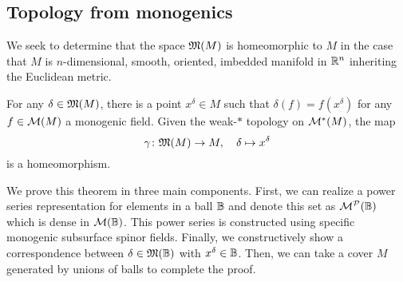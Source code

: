 \subsection{Topology from monogenics}

We seek to determine that the space $\mathfrak{M}(M)$ is homeomorphic to $M$ in the case that $M$ is $n$-dimensional, smooth, oriented, imbedded manifold in $\mathbb{R}^n$ inheriting the Euclidean metric. 

\begin{theorem}
\label{thm:gelfand}
For any $\delta \in \mathfrak{M}(M)$, there is a point $x^\delta \in M$ such that $\delta(f) = f(x^\delta)$ for any $f\in \mathcal{M}(M)$ a monogenic field. Given the weak-$\ast$ topology on $\mathcal{M}^*(M)$, the map
\[
\gamma \colon \mathfrak{M}(M) \to M, \quad \delta \mapsto x^\delta
\]
is a homeomorphism. 
\end{theorem}

We prove this theorem in three main components. First, we can realize a power series representation for elements in a ball $\mathbb{B}$ and denote this set as $\mathcal{M}^\mathcal{P}(\mathbb{B})$ which is dense in $\mathcal{M}(\mathbb{B})$. This power series is constructed using specific monogenic subsurface spinor fields. Finally, we constructively show a correspondence between $\delta \in \mathfrak{M}(\mathbb{B})$ with $x^\delta \in \mathbb{B}$. Then, we can take a cover $M$ generated by unions of balls to complete the proof.

